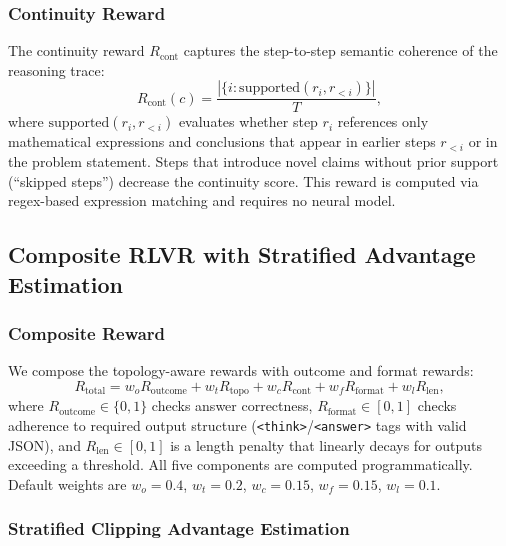 \subsubsection{Continuity Reward}
\label{sec:r_cont}

The continuity reward $R_{\mathrm{cont}}$ captures the step-to-step
semantic coherence of the reasoning trace:
\begin{equation}
\label{eq:r_cont}
R_{\mathrm{cont}}(c) = \frac{|\{i : \mathrm{supported}(r_i, r_{<i})\}|}{T},
\end{equation}
where $\mathrm{supported}(r_i, r_{<i})$ evaluates whether step $r_i$
references only mathematical expressions and conclusions that appear in
earlier steps $r_{<i}$ or in the problem statement. Steps that introduce
novel claims without prior support (``skipped steps'') decrease the
continuity score. This reward is computed via regex-based expression
matching and requires no neural model.

\subsection{Composite RLVR with Stratified Advantage Estimation}
\label{sec:composite_rlvr}

\subsubsection{Composite Reward}
\label{sec:composite_reward}

We compose the topology-aware rewards with outcome and format rewards:
\begin{equation}
\label{eq:r_total}
R_{\mathrm{total}} = w_o R_{\mathrm{outcome}} + w_t R_{\mathrm{topo}}
    + w_c R_{\mathrm{cont}} + w_f R_{\mathrm{format}}
    + w_l R_{\mathrm{len}},
\end{equation}
where $R_{\mathrm{outcome}} \in \{0, 1\}$ checks answer correctness,
$R_{\mathrm{format}} \in [0, 1]$ checks adherence to required output
structure (\texttt{<think>}/\texttt{<answer>} tags with valid JSON), and
$R_{\mathrm{len}} \in [0, 1]$ is a length penalty that linearly decays
for outputs exceeding a threshold. All five components are computed
programmatically. Default weights are $w_o = 0.4$, $w_t = 0.2$,
$w_c = 0.15$, $w_f = 0.15$, $w_l = 0.1$.

\subsubsection{Stratified Clipping Advantage Estimation}
\label{sec:scae}


